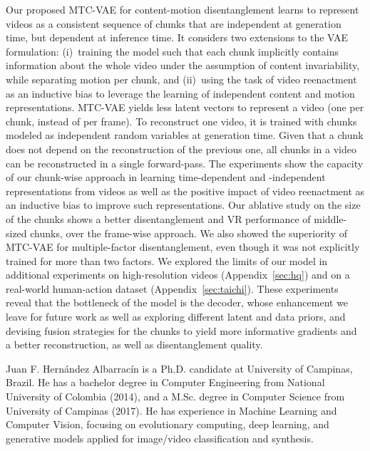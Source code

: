 \documentclass[journal]{IEEEtran}
\begin{document}
Our proposed MTC-VAE for content-motion disentanglement learns to represent videos as a consistent sequence of chunks that are independent at generation time, but dependent at inference time.
It considers two extensions to the VAE formulation: (i)~training the model such that each chunk implicitly contains information about the whole video under the assumption of content invariability, while separating motion per chunk, and (ii)~using the task of video reenactment as an inductive bias to leverage the learning of independent content and motion representations.
MTC-VAE yields less latent vectors to represent a video (one per chunk, instead of per frame).
To reconstruct one video, it is trained with chunks modeled as independent random variables at generation time.
Given that a chunk does not depend on the reconstruction of the previous one, all chunks in a video can be reconstructed in a single forward-pass.
The experiments show the capacity of our chunk-wise approach in learning time-dependent and -independent representations from videos as well as the positive impact of video reenactment as an inductive bias to improve such representations.
Our ablative study on the size of the chunks shows a better disentanglement and VR performance of middle-sized chunks, over the frame-wise approach.
We also showed the superiority of MTC-VAE for multiple-factor disentanglement, even though it was not explicitly trained for more than two factors.
We explored the limits of our model in additional experiments on high-resolution videos (Appendix~\ref{sec:hq}) and on a real-world human-action dataset (Appendix~\ref{sec:taichi}).
These experiments reveal that the bottleneck of the model is the decoder, whose enhancement we leave for future work as well as exploring different latent and data priors, and devising fusion strategies for the chunks to yield more informative gradients and a better reconstruction, as well as disentanglement quality.


\printbibliography


\begin{IEEEbiography}{Juan F. Hern\'{a}ndez Albarrac\'{i}n}
is a Ph.D. candidate at University of Campinas, Brazil. He has a bachelor degree in Computer Engineering from National University of Colombia (2014), and a M.Sc. degree in Computer Science from University of Campinas (2017). He has experience in Machine Learning and Computer Vision, focusing on evolutionary computing, deep learning, and generative models applied for image/video classification and synthesis.
\end{IEEEbiography}
\end{document}
